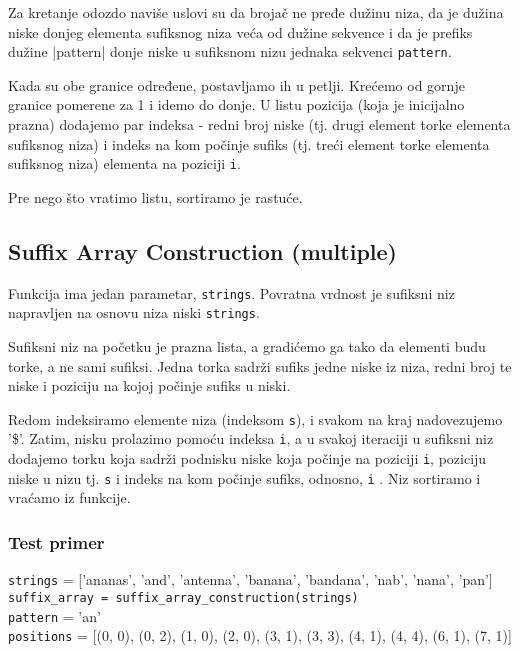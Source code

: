 Za kretanje odozdo naviše uslovi su da brojač ne pređe dužinu niza, da je dužina niske donjeg elementa sufiksnog niza veća od dužine sekvence i da je prefiks dužine |pattern| donje niske u sufiksnom nizu jednaka sekvenci \texttt{pattern}.

Kada su obe granice određene, postavljamo ih u petlji. Krećemo od gornje granice pomerene za 1 i idemo do donje. U listu pozicija (koja je inicijalno prazna) dodajemo par indeksa - redni broj niske (tj. drugi element torke elementa sufiksnog niza) i indeks na kom počinje sufiks (tj. treći element torke elementa sufiksnog niza) elementa na poziciji \texttt{i}.

Pre nego što vratimo listu, sortiramo je rastuće.

\newpage



\subsection{Suffix Array Construction (multiple)}
\label{suffixArrayConstructionM}

Funkcija ima jedan parametar, \texttt{strings}. Povratna vrdnost je sufiksni niz napravljen na osnovu niza niski \texttt{strings}.

Sufiksni niz na početku je prazna lista, a gradićemo ga tako da elementi budu torke, a ne sami sufiksi. Jedna torka sadrži sufiks jedne niske iz niza, redni broj te niske i poziciju na kojoj počinje sufiks u niski.

Redom indeksiramo elemente niza (indeksom \texttt{s}), i svakom na kraj nadovezujemo '\$'. Zatim, nisku prolazimo pomoću indeksa \texttt{i}, a u svakoj iteraciji u sufiksni niz dodajemo torku koja sadrži podnisku niske koja počinje na poziciji \texttt{i}, poziciju niske u nizu tj. \texttt{s} i indeks na kom počinje sufiks, odnosno, \texttt{i} . Niz sortiramo i vraćamo iz funkcije.





\subsubsection{Test primer}

\noindent\texttt{strings} = ['ananas', 'and', 'antenna', 'banana', 'bandana', 'nab', 'nana', 'pan']
\\\texttt{suffix\_array = suffix\_array\_construction(strings)}
\\\texttt{pattern} = 'an'
\\\texttt{positions} = [(0, 0), (0, 2), (1, 0), (2, 0), (3, 1), (3, 3), (4, 1), (4, 4), (6, 1), (7, 1)]


